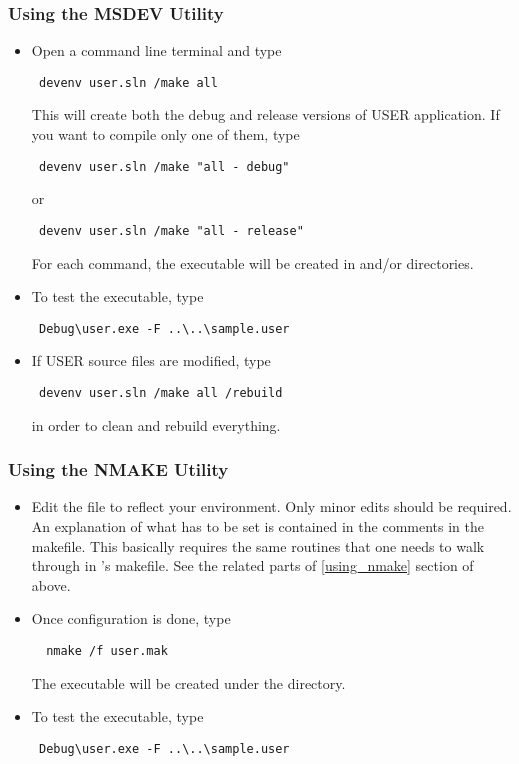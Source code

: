 \subsubsection{Using the MSDEV Utility}
\begin{itemize}
\item Open a command line terminal and type
{\color{Brown}
\begin{verbatim}
 devenv user.sln /make all
\end{verbatim}
}
This will create both the debug and release versions of USER application. 
If you want to compile only one of them, type
{\color{Brown}
\begin{verbatim}
 devenv user.sln /make "all - debug"
\end{verbatim}
}
or 
{\color{Brown}
\begin{verbatim}
 devenv user.sln /make "all - release"
\end{verbatim}
}
For each command, the executable  will be created in 
 and/or 
directories. 

\item To test the executable, type 
{\color{Brown}
\begin{verbatim}
 Debug\user.exe -F ..\..\sample.user
\end{verbatim}
}
\item If USER source files are modified, type 
{\color{Brown}
\begin{verbatim}
 devenv user.sln /make all /rebuild
\end{verbatim}
}
in order to clean and rebuild everything.
\end{itemize} 

\subsubsection{Using the NMAKE Utility}

\begin{itemize}
\item 
Edit the file  to reflect your environment. 
Only minor edits should be required. An explanation of 
what has to be set is contained in the comments in the makefile. 
This basically 
requires the same routines that one needs to walk through in 
's makefile. 
See the related parts of \ref{using_nmake} section 
of  above.

\item Once configuration is done, type 
{\color{Brown}
\begin{verbatim}
  nmake /f user.mak
\end{verbatim}
}
The executable  will be created under the 
 directory.
\item To test the executable, type 
{\color{Brown}
\begin{verbatim}
 Debug\user.exe -F ..\..\sample.user
\end{verbatim}
}
\end{itemize}

